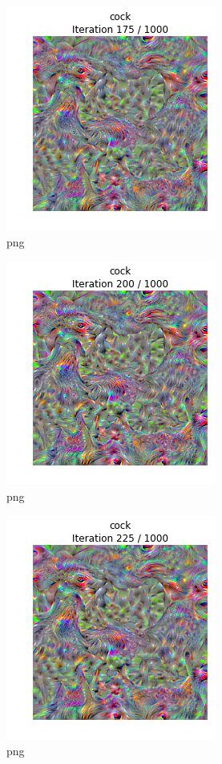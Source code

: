 \documentclass[]{book}
\theoremstyle{definition}
\theoremstyle{definition}
\theoremstyle{definition}
\theoremstyle{remark}
\begin{document}
\begin{figure}
\centering
\includegraphics{Network-Visualization-TensorFlow_files/Network-Visualization-TensorFlow_22_7.png}
\caption{png}
\end{figure}

\begin{figure}
\centering
\includegraphics{Network-Visualization-TensorFlow_files/Network-Visualization-TensorFlow_22_8.png}
\caption{png}
\end{figure}

\begin{figure}
\centering
\includegraphics{Network-Visualization-TensorFlow_files/Network-Visualization-TensorFlow_22_9.png}
\caption{png}
\end{figure}
\end{document}
